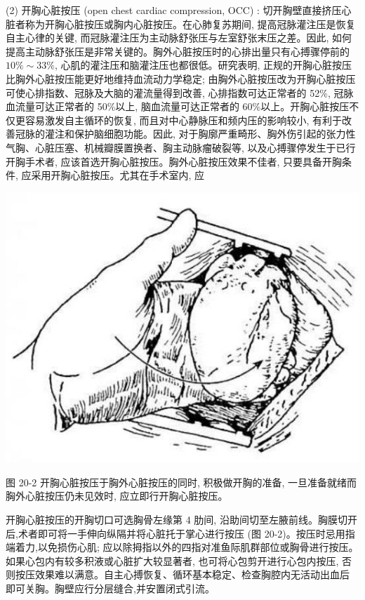 \documentclass[10pt]{article}
\begin{document}
(2) 开胸心脏按压 (open chest cardiac compression, OCC) : 切开胸壁直接挤压心脏者称为开胸心脏按压或胸内心脏按压。在心肺复苏期间, 提高冠脉灌注压是恢复自主心律的关键, 而冠脉灌注压为主动脉舒张压与左室舒张末压之差。因此, 如何提高主动脉舒张压是非常关键的。胸外心脏按压时的心排出量只有心搏骤停前的 $10 \% \sim 33 \%$, 心肌的灌注压和脑灌注压也都很低。研究表明, 正规的开胸心脏按压比胸外心脏按压能更好地维持血流动力学稳定; 由胸外心脏按压改为开胸心脏按压可使心排指数、冠脉及大脑的灌流量得到改善, 心排指数可达正常者的 52\%, 冠脉血流量可达正常者的 50\%以上, 脑血流量可达正常者的 60\%以上。开胸心脏按压不仅更容易激发自主循环的恢复, 而且对中心静脉压和频内压的影响较小, 有利于改善冠脉的灌注和保护脑细胞功能。因此, 对于胸廓严重畸形、胸外伤引起的张力性气胸、心脏压塞、机械瓣膜置换者、胸主动脉瘤破裂等, 以及心搏骤停发生于已行开胸手术者, 应该首选开胸心脏按压。胸外心脏按压效果不佳者, 只要具备开胸条件, 应采用开胸心脏按压。尤其在手术室内, 应

\begin{center}
\includegraphics[max width=\textwidth]{2024_07_09_002a177993bd97d1d6d7g-208}
\end{center}

图 20-2 开胸心脏按压于胸外心脏按压的同时, 积极做开胸的准备, 一旦准备就绪而胸外心脏按压仍未见效时, 应立即行开胸心脏按压。

开胸心脏按压的开胸切口可选胸骨左缘第 4 肋间, 沿助间切至左腋前线。胸膜切开后,术者即可将一手伸向纵隔并将心脏托于掌心进行按压 (图 20-2)。按压时忌用指端着力,以免损伤心肌; 应以除拇指以外的四指对准鱼际肌群部位或胸骨进行按压。如果心包内有较多积液或心脏扩大较显著者, 也可将心包剪开进行心包内按压, 否则按压效果难以满意。自主心搏恢复、循环基本稳定、检查胸腔内无活动出血后\\
即可关胸。胸壁应行分层缝合,并安置闭式引流。
\end{document}
